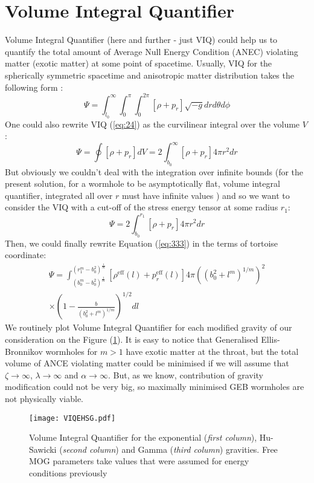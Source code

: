 \section{Volume Integral Quantifier}\label{sec5}

Volume Integral Quantifier (here and further - just VIQ) could help us to quantify the total amount of Average Null Energy Condition (ANEC) violating matter (exotic matter) at some point of spacetime. Usually, VIQ for the spherically symmetric spacetime and anisotropic matter distribution takes the following form \cite{ref79}:
\begin{equation}
    \Psi = \int^\infty_{l_0}\int^\pi_0\int^{2\pi}_0[\rho+p_r]\sqrt{-g}drd\theta d\phi
    \label{eq:24}
\end{equation}
One could also rewrite VIQ (\ref{eq:24}) as the curvilinear integral over the volume $V$:
\begin{equation}
    \Psi = \oint [\rho+p_r]dV=2\int^\infty_{b_0}[\rho+p_r]4\pi r^2 dr
\end{equation}
But obviously we couldn't deal with the integration over infinite bounds (for the present solution, for a wormhole to be asymptotically flat, volume integral quantifier, integrated all over $r$ must have infinite values \cite{ref80}) and so we want to consider the VIQ with a cut-off of the stress energy tensor at some radius $r_1$:
\begin{equation}
    \Psi = 2\int^{r_1}_{b_0}[\rho+p_r]4\pi r^2 dr
    \label{eq:333}
\end{equation}
Then, we could finally rewrite Equation (\ref{eq:333}) in the terms of tortoise coordinate:
\begin{multline}
\Psi = \int^{\left(r_1^m-b_0^2\right)^{\frac{1}{m}}}_{\left(b_0^m-b_0^2\right)^{\frac{1}{m}}}[\rho^{\mathrm{eff}}(l)+p_r^{\mathrm{eff}}(l)]4\pi ((b_0^2+l^m)^{1/m})^2\\
\times \left(1-\frac{b}{(b_0^2+l^m)^{1/m}}\right)^{1/2}dl
\end{multline}
We routinely plot Volume Integral Quantifier for each modified gravity of our consideration on the Figure (\ref{fig:8}). It is easy to notice that Generalised Ellis-Bronnikov wormholes for $ m>1$ have exotic matter at the throat, but the total volume of ANCE violating matter could be minimised if we will assume that $\zeta\to\infty$, $\lambda\to\infty$ and $\alpha\to\infty$. But, as we know, contribution of gravity modification could not be very big, so maximally minimised GEB wormholes are not physically viable. 
\begin{widetext}

\begin{figure}[!htbp]
    \centering
    \texttt{[image: VIQEHSG.pdf]}
    \caption{Volume Integral Quantifier for the exponential (\textit{first column}), Hu-Sawicki (\textit{second column}) and Gamma (\textit{third column}) gravities. Free MOG parameters take values that were assumed for energy conditions previously}
    \label{fig:8}
\end{figure}

\end{widetext}


